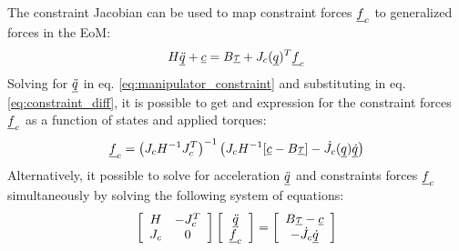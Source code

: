 {The constraint Jacobian can be used to map constraint forces $\underline{f}_c$ to generalized forces in the EoM:
%
\begin{align}
H \underline{\ddot{q}} + \underline{c} = B \underline{\tau} + J_c( \underline{ q } )^T  \underline{f}_c
\label{eq:manipulator_constraint}
\end{align}
%
Solving for $\underline{\ddot{q}}$ in eq. \eqref{eq:manipulator_constraint} and substituting in eq. \eqref{eq:constraint_diff}, it is possible to get and expression for the constraint forces $\underline{f}_c$ as a function of states and applied torques:
%
\begin{align}
\underline{f}_c = \left( J_c H^{-1} J_c^T \right)^{-1} \left(  J_c H^{-1} [\underline{c} - B \underline{\tau} ] - \dot{J}_c( \underline{ q } ) \underline{\dot{q}}   \right)
\label{eq:const_forces}
\end{align}
%
Alternatively, it possible to solve for acceleration $\underline{\ddot{q}}$ and constraints forces $\underline{f}_c$ simultaneously by solving the following system of equations:
%
\begin{align}
\left[ \begin{array}{c c } 	H & -J_c^T  \\ J_c 	& 0  	\end{array} \right] \left[ \begin{array}{c} \underline{\ddot{q}}  \\ \underline{f}_c \end{array} \right] = \left[ \begin{array}{c}  B \underline{\tau} - \underline{c}   \\ -\dot{J}_c \underline{\dot{q}}  \end{array} \right]
\label{eq:manipulator_constraint_eom}
\end{align}


}
